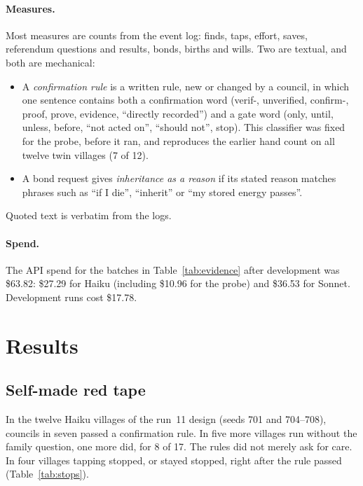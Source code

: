 \documentclass[11pt]{article}
\begin{document}
\paragraph{Measures.} Most measures are counts from the event log: finds, taps, effort, saves,
referendum questions and results, bonds, births and wills. Two are textual, and both are mechanical:
\begin{itemize}
  \item A \emph{confirmation rule} is a written rule, new or changed by a council, in which one
  sentence contains both a confirmation word (verif-, unverified, confirm-, proof, prove, evidence,
  ``directly recorded'') and a gate word (only, until, unless, before, ``not acted on'', ``should
  not'', stop). This classifier was fixed for the probe, before it ran, and reproduces the earlier
  hand count on all twelve twin villages (7 of 12).
  \item A bond request gives \emph{inheritance as a reason} if its stated reason matches phrases such
  as ``if I die'', ``inherit'' or ``my stored energy passes''.
\end{itemize}
Quoted text is verbatim from the logs.

\paragraph{Spend.} The API spend for the batches in Table~\ref{tab:evidence} after development was \$63.82:
\$27.29 for Haiku (including \$10.96 for the probe) and \$36.53 for Sonnet. Development runs cost
\$17.78.

\section{Results}\label{sec:results}

\subsection{Self-made red tape}\label{sec:redtape}

In the twelve Haiku villages of the run~11 design (seeds 701 and 704--708), councils in seven passed a
confirmation rule. In five more villages run without the family question, one more did, for 8 of 17.
The rules did not merely ask for care. In four villages tapping stopped, or stayed stopped, right
after the rule passed (Table~\ref{tab:stops}).
\end{document}
